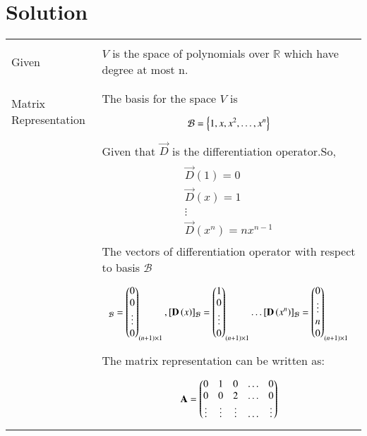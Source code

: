 \documentclass[journal,12pt]{IEEEtran}
\begin{document}
\section{\textbf{Solution}}
\renewcommand{\thetable}{2}
\begin{longtable}{|l|l|}
	\hline
	\multirow{3}{*}{Given} & \\
	& $V$ is the space of polynomials over $\mathbb{R}$ which have degree at most n.\\
    & \\
    \hline
	\multirow{3}{*}{Matrix Representation}
	& \\
	& The basis for the space $V$ is \\
	&\parbox{10cm}
	{\begin{align}
	\mathcal{B}=\left\{1,x,x^2,\dots,x^n\right\}
	\end{align}}\\
	& Given that $\vec{D}$ is the differentiation operator.So,\\
	&\parbox{10cm}
	{\begin{align}
	\vec{D}(1)=0\\
	\vec{D}(x)=1\\
	\vdots \nonumber \\
	\vec{D}(x^n)=nx^{n-1}
	\end{align}}\\
	&The vectors of differentiation operator with respect to basis $\mathcal{B}$ \\
	&\parbox{10cm}
	{\begin{align}
	[\vec{D}\brak{1}]_{\mathcal{B}}=\myvec{0\\0\\\vdots\\0}_{(n+1)\times 1},
	[\vec{D}\brak{x}]_{\mathcal{B}}=\myvec{1\\0\\\vdots\\0}_{(n+1)\times 1} \dots
	[\vec{D}\brak{x^n}]_{\mathcal{B}}=\myvec{0\\\vdots\\n\\0}_{(n+1)\times 1}
	\end{align}}\nonumber\\
	&The matrix representation can be written as:\\
	&\parbox{10cm}
	{\begin{align}
	\mathbf{A}=
	\begin{pmatrix}0&1&0&\dots&0\\
	0&0&2&\dots&0\\
	\vdots & \vdots & \vdots & \dots & \vdots\\
\end{pmatrix}
\end{align}}
\end{longtable}
\end{document}
